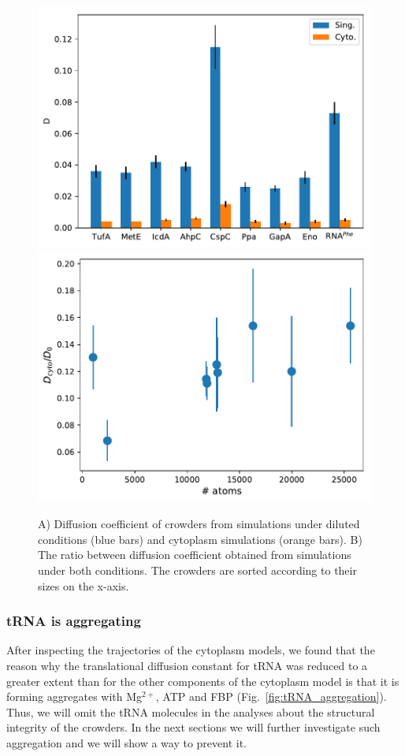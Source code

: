 \documentclass[journal=jacsat,manuscript=article]{achemso}
\begin{document}
\begin{figure}[H]
\includegraphics[scale=0.5]{msd.pdf}
\includegraphics[scale=0.5]{diff_cyto_over_singles.pdf}
\caption{A) Diffusion coefficient of crowders from simulations under diluted conditions (blue bars) and cytoplasm simulations (orange bars). B) The ratio between diffusion coefficient obtained from simulations under both conditions. The crowders are sorted according to their sizes on the x-axis.}
\label{fig:translational_diffusion}
\end{figure}






\subsubsection{tRNA is aggregating}
After inspecting the trajectories of the cytoplasm models, we found that the reason why the translational diffusion constant for tRNA was reduced to a greater extent than for the other components of the cytoplasm model is that it is forming aggregates with Mg$^{2+}$, ATP and FBP (Fig.~\ref{fig:tRNA_aggregation}). Thus, we will omit the tRNA molecules in the analyses about the structural integrity of the crowders. In the next sections we will further investigate such aggregation and we will show a way to prevent it.
\end{document}
